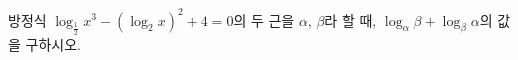방정식 $\log_{\frac{1}{2}} x^{3}-(\log_2 x)^{2}+4=0$의 두 근을 $\alpha$, $\beta$라 할 때, $\log_{\alpha} \beta+\log_{\beta} \alpha$의 값을 구하시오.
